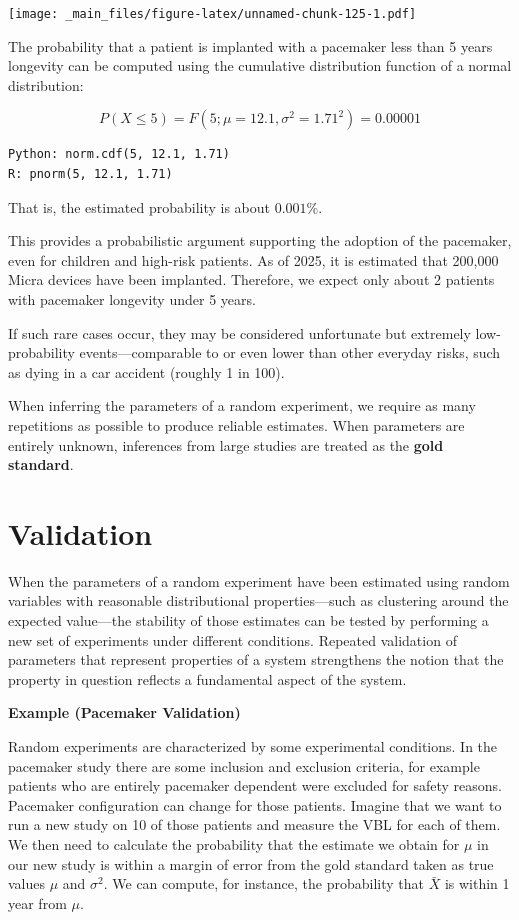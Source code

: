 \documentclass[
]{book}
\begin{document}
\texttt{[image: \_main\_files/figure-latex/unnamed-chunk-125-1.pdf]}

The probability that a patient is implanted with a pacemaker less than 5 years longevity can be computed using the cumulative distribution function of a normal distribution:

\[
P(X \leq 5) = F(5; \mu = 12.1, \sigma^2 = 1.71^2) = 0.00001
\]

\begin{verbatim}
Python: norm.cdf(5, 12.1, 1.71)
R: pnorm(5, 12.1, 1.71)
\end{verbatim}

That is, the estimated probability is about \(0.001\%\).

This provides a probabilistic argument supporting the adoption of the pacemaker, even for children and high-risk patients. As of 2025, it is estimated that 200,000 Micra devices have been implanted. Therefore, we expect only about 2 patients with pacemaker longevity under 5 years.

If such rare cases occur, they may be considered unfortunate but extremely low-probability events---comparable to or even lower than other everyday risks, such as dying in a car accident (roughly 1 in 100).

When inferring the parameters of a random experiment, we require as many repetitions as possible to produce reliable estimates. When parameters are entirely unknown, inferences from large studies are treated as the \textbf{gold standard}.

\hypertarget{validation}{%
\section{Validation}\label{validation}}

When the parameters of a random experiment have been estimated using random variables with reasonable distributional properties---such as clustering around the expected value---the stability of those estimates can be tested by performing a new set of experiments under different conditions. Repeated validation of parameters that represent properties of a system strengthens the notion that the property in question reflects a fundamental aspect of the system.

\textbf{Example (Pacemaker Validation)}

Random experiments are characterized by some experimental conditions. In the pacemaker study there are some inclusion and exclusion criteria, for example patients who are entirely pacemaker dependent were excluded for safety reasons. Pacemaker configuration can change for those patients. Imagine that we want to run a new study on 10 of those patients and measure the VBL for each of them. We then need to calculate the probability that the estimate we obtain for \(\mu\) in our new study is within a margin of error from the gold standard taken as true values \(\mu\) and \(\sigma^2\). We can compute, for instance, the probability that \(\bar{X}\) is within 1 year from \(\mu\).
\end{document}
